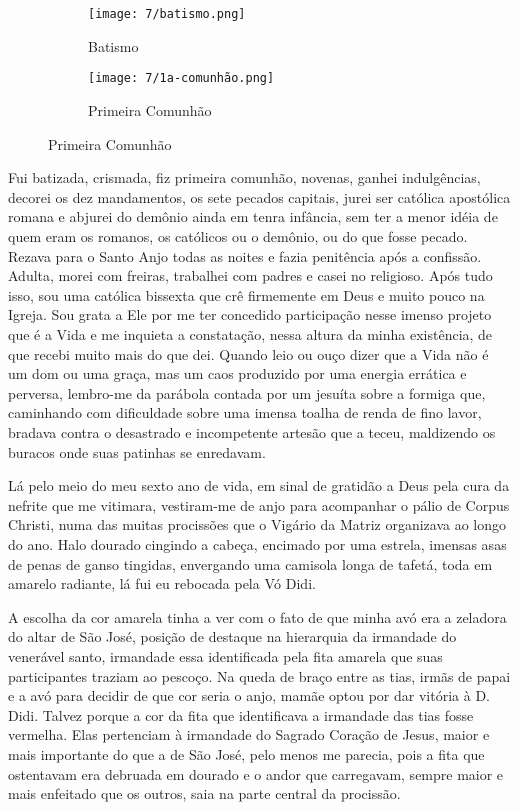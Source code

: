 \chapter{}

\begin{figure}[H]
\hfill
\centering
\begin{subfigure}[h]{0.4\linewidth}
    \centering
\texttt{[image: 7/batismo.png]}
\caption{Batismo}
\end{subfigure}
\hfill
\begin{subfigure}[h]{0.4\linewidth}
    \centering
\texttt{[image: 7/1a-comunhão.png]}
\caption{Primeira Comunhão}
\end{subfigure}
\end{figure}

Fui batizada, crismada, fiz primeira comunhão, novenas, ganhei indulgências, decorei os dez mandamentos, os sete pecados capitais, jurei ser católica apostólica romana e abjurei do demônio ainda em tenra infância, sem ter a menor idéia de quem eram os romanos, os católicos ou o demônio, ou do que fosse pecado. 
Rezava para o Santo Anjo todas as noites e fazia penitência após a confissão. 
Adulta, morei com freiras, trabalhei com padres e casei no religioso. 
Após tudo isso, sou uma católica bissexta que crê firmemente em Deus e muito pouco na Igreja. 
Sou grata a Ele por me ter concedido participação nesse imenso projeto que é a Vida e me inquieta a constatação, nessa altura da minha existência, de que recebi muito mais do que dei. 
Quando leio ou ouço dizer que a Vida não é um dom ou uma graça, mas um caos produzido por uma energia errática e perversa, lembro-me da parábola contada por um jesuíta sobre a formiga que, caminhando com dificuldade sobre uma imensa toalha de renda de fino lavor, bradava contra o desastrado e incompetente artesão que a teceu, maldizendo os buracos onde suas patinhas se enredavam.

Lá pelo meio do meu sexto ano de vida, em sinal de gratidão a Deus pela cura da nefrite que me vitimara, vestiram-me de anjo para acompanhar o pálio de Corpus Christi, numa das muitas procissões que o Vigário da Matriz organizava ao longo do ano. 
Halo dourado cingindo a cabeça, encimado por uma estrela, imensas asas de penas de ganso tingidas, envergando uma camisola longa de tafetá, toda em amarelo radiante, lá fui eu rebocada pela Vó Didi. 

A escolha da cor amarela tinha a ver com o fato de que minha avó era a zeladora do altar de São José, posição de destaque na hierarquia da irmandade do venerável santo, irmandade essa identificada pela fita amarela que suas participantes traziam ao pescoço. 
Na queda de braço entre as tias, irmãs de papai e a avó para decidir de que cor seria o anjo, mamãe optou por dar vitória à D. Didi. 
Talvez porque a cor da fita que identificava a irmandade das tias fosse vermelha. 
Elas pertenciam à irmandade do Sagrado Coração de Jesus, maior e mais importante do que a de São José, pelo menos me parecia, pois a fita que ostentavam era debruada em dourado e o andor que carregavam, sempre maior e mais enfeitado que os outros, saia na parte central da procissão. 


